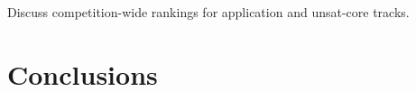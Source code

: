 \documentclass[twoside,11pt]{article}
\begin{document}
\begin{tjark}
  Discuss competition-wide rankings for application and unsat-core
  tracks.
\end{tjark}
  

\section{Conclusions}
\label{sec:conclusions}


 
\end{document}

